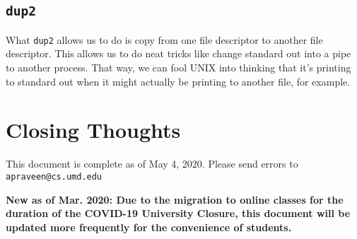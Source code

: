 \documentclass[english, 10pt]{article}
\begin{document}
\subsection{\texttt{dup2}}

What \texttt{dup2} allows us to do is copy from one file descriptor to another file descriptor. This allows us to do neat tricks like change standard out into a pipe to another process. That way, we can fool UNIX into thinking that it's printing to standard out when it might actually be printing to another file, for example.

\section{Closing Thoughts}

This document is complete as of May 4, 2020. Please send errors to \texttt{apraveen@cs.umd.edu}\newline

\textbf{New as of Mar. 2020: Due to the migration to online classes for the duration of the COVID-19 University Closure, this document will be updated more frequently for the convenience of students.}
\end{document}

